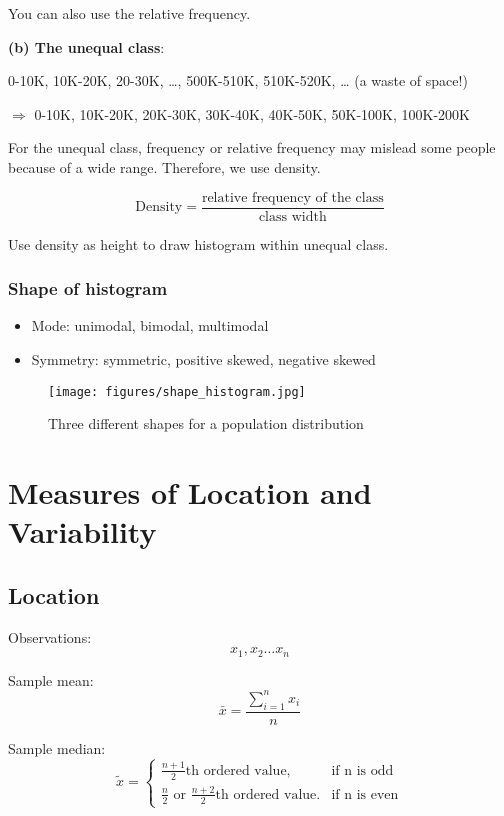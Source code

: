 You can also use the relative frequency.

\vspace{2mm}

\textbf{(b) The unequal class}:
\begin{exmp}
  0-10K, 10K-20K, 20-30K, \dots, 500K-510K, 510K-520K, \dots 
  (a waste of space!) 
  
  $\Rightarrow $  0-10K, 10K-20K, 20K-30K, 30K-40K, 40K-50K,  50K-100K, 100K-200K
\end{exmp}

For the unequal class, frequency or relative frequency may mislead some people because of a wide range. Therefore, we use density.

\[ \text{Density} = \frac{\text{relative frequency of the class}}{\text{class width}}	\]

Use density as height to draw histogram within unequal class.
\subsubsection{Shape of histogram}
\begin{itemize}
  \item Mode: unimodal, bimodal, multimodal
  \item Symmetry: symmetric, positive skewed, negative skewed
\end{itemize}

\begin{figure}[H]
\centering
\texttt{[image: figures/shape\_histogram.jpg]}
\caption{Three different shapes for a population distribution}
\label{fig:2}
\end{figure}

\section{Measures of Location and Variability}
\subsection{Location}

Observations: \[x_1,x_2 \dots x_n\]

Sample mean:
\[\bar{x}=\frac{\sum_{i=1}^{n} x_i}{n}\]

Sample median:
\[	\tilde{x}=\begin{cases}
\frac{n+1}{2}\text{th ordered value}, &\text{if n is odd}\\
\frac{n}{2}\text{ or }\frac{n+2}{2}\text{th ordered value}. &\text{if n is even}
\end{cases}	\]


